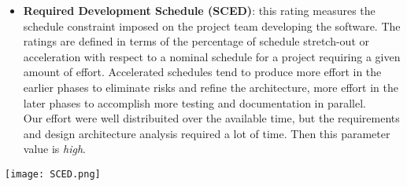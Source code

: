 \begin{itemize}
	\item \textbf{Required Development Schedule (SCED)}: this rating measures the schedule constraint imposed on the project team developing the software. The ratings are defined in terms of the percentage of schedule stretch-out or acceleration with respect to a nominal schedule for a project requiring a given amount of effort. Accelerated schedules tend to produce more effort in the earlier phases to eliminate risks and refine the architecture, more effort in the later phases to accomplish more testing and
	documentation in parallel. \\ Our effort were well distribuited over the available time, but the requirements and design architecture analysis required a lot of time. Then this parameter value is \textit{high}.
\end{itemize}
\begin{center}
	\texttt{[image: SCED.png]}
\end{center}

